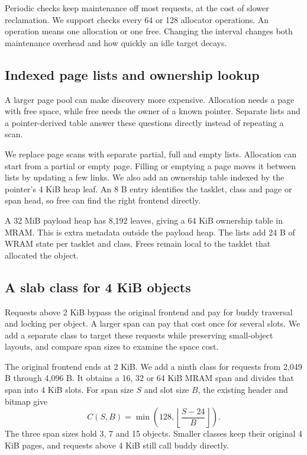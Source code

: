 \documentclass[conference]{IEEEtran}
\begin{document}
Periodic checks keep maintenance off most requests, at the cost of slower reclamation. We support checks every 64 or 128 allocator operations. An operation means one allocation or one free. Changing the interval changes both maintenance overhead and how quickly an idle target decays.

\subsection{Indexed page lists and ownership lookup}
A larger page pool can make discovery more expensive. Allocation needs a page with free space, while free needs the owner of a known pointer. Separate lists and a pointer-derived table answer these questions directly instead of repeating a scan.

We replace page scans with separate partial, full and empty lists. Allocation can start from a partial or empty page. Filling or emptying a page moves it between lists by updating a few links. We also add an ownership table indexed by the pointer's 4 KiB heap leaf. An 8 B entry identifies the tasklet, class and page or span head, so free can find the right frontend directly.

A 32 MiB payload heap has 8,192 leaves, giving a 64 KiB ownership table in MRAM. This is extra metadata outside the payload heap. The lists add 24 B of WRAM state per tasklet and class. Frees remain local to the tasklet that allocated the object.

\subsection{A slab class for 4 KiB objects}
Requests above 2 KiB bypass the original frontend and pay for buddy traversal and locking per object. A larger span can pay that cost once for several slots. We add a separate class to target these requests while preserving small-object layouts, and compare span sizes to examine the space cost.

The original frontend ends at 2 KiB. We add a ninth class for requests from 2,049 B through 4,096 B. It obtains a 16, 32 or 64 KiB MRAM span and divides that span into 4 KiB slots. For span size $S$ and slot size $B$, the existing header and bitmap give
\begin{equation}
 C(S,B)=\min\left(128,\left\lfloor\frac{S-24}{B}\right\rfloor\right).
\end{equation}
The three span sizes hold 3, 7 and 15 objects. Smaller classes keep their original 4 KiB pages, and requests above 4 KiB still call buddy directly.
\end{document}
